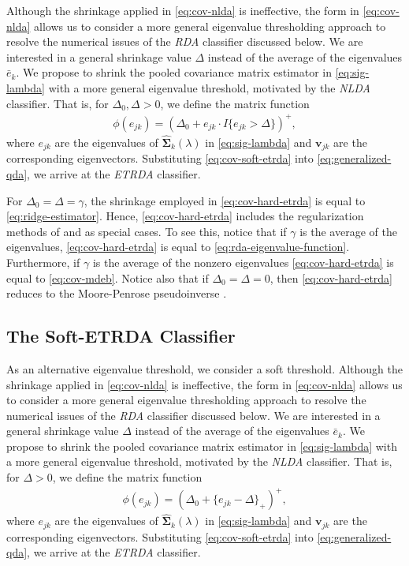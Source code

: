 \documentclass[11pt]{article}
\begin{document}
Although the shrinkage applied in \eqref{eq:cov-nlda} is ineffective, the form in \eqref{eq:cov-nlda} allows us to consider a more general eigenvalue thresholding approach to resolve the numerical issues of the \emph{RDA} classifier discussed below. We are interested in a general shrinkage value $\Delta$ instead of the average of the eigenvalues $\bar{e}_k$. We propose to shrink the pooled covariance matrix estimator in \eqref{eq:sig-lambda} with a more general eigenvalue threshold, motivated by the \emph{NLDA} classifier. That is, for $\Delta_0, \Delta > 0$, we define the matrix function
\begin{align}
	\phi(e_{jk}) = (\Delta_0 + e_{jk} \cdot I\{e_{jk} > \Delta\} )^{+},\label{eq:cov-hard-etrda}
\end{align}
where $e_{jk}$ are the eigenvalues of $\widehat{\bm \Sigma}_k(\lambda)$ in \eqref{eq:sig-lambda} and $\bm v_{jk}$ are the corresponding eigenvectors. Substituting \eqref{eq:cov-soft-etrda} into \eqref{eq:generalized-qda}, we arrive at the \emph{ETRDA} classifier.

For $\Delta_0 = \Delta = \gamma$, the shrinkage employed in \eqref{eq:cov-hard-etrda} is equal to \eqref{eq:ridge-estimator}. Hence, \eqref{eq:cov-hard-etrda} includes the regularization methods of \cite{Friedman:1989tm} and \cite{Srivastava:2007ww} as special cases. To see this, notice that if $\gamma$ is the average of the eigenvalues, \eqref{eq:cov-hard-etrda} is equal to \eqref{eq:rda-eigenvalue-function}. Furthermore, if $\gamma$ is the average of the nonzero eigenvalues \eqref{eq:cov-hard-etrda} is equal to \eqref{eq:cov-mdeb}. Notice also that if $\Delta_0 = \Delta = 0$, then \eqref{eq:cov-hard-etrda} reduces to the Moore-Penrose pseudoinverse \citep{Harville:2008wja}.


\subsection{The Soft-ETRDA Classifier}

As an alternative eigenvalue threshold, we consider a soft threshold. Although the shrinkage applied in \eqref{eq:cov-nlda} is ineffective, the form in \eqref{eq:cov-nlda} allows us to consider a more general eigenvalue thresholding approach to resolve the numerical issues of the \emph{RDA} classifier discussed below. We are interested in a general shrinkage value $\Delta$ instead of the average of the eigenvalues $\bar{e}_k$. We propose to shrink the pooled covariance matrix estimator in \eqref{eq:sig-lambda} with a more general eigenvalue threshold, motivated by the \emph{NLDA} classifier. That is, for $\Delta > 0$, we define the matrix function
\begin{align}
	\phi(e_{jk}) = (\Delta_0 + \{e_{jk} - \Delta\}_+)^{+},\label{eq:cov-soft-etrda}
\end{align}
where $e_{jk}$ are the eigenvalues of $\widehat{\bm \Sigma}_k(\lambda)$ in \eqref{eq:sig-lambda} and $\bm v_{jk}$ are the corresponding eigenvectors. Substituting \eqref{eq:cov-soft-etrda} into \eqref{eq:generalized-qda}, we arrive at the \emph{ETRDA} classifier.
\end{document}
